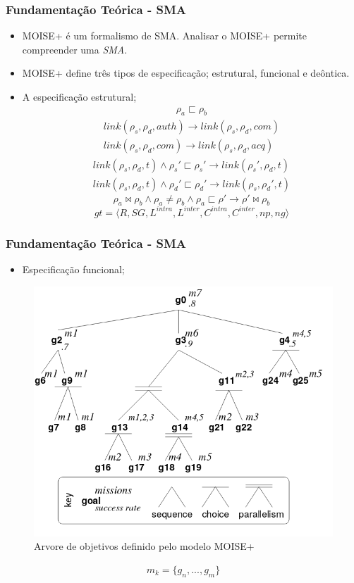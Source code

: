 \documentclass{beamer}
\begin{document}
\begin{frame}
\frametitle{Fundamentação Teórica - SMA}
	\begin{itemize}
		\item MOISE+ é um formalismo de SMA. Analisar o MOISE+ permite compreender uma \textit{SMA}. 
		\item MOISE+ define três tipos de especificação; estrutural, funcional e deôntica. 
		\item A especificação estrutural;
	\begin{eqnarray}
			\rho_a \sqsubset \rho_b
		\end{eqnarray}
		\begin{eqnarray}\nonumber
			link(\rho_s,\rho_d,auth) \to link(\rho_s,\rho_d,com) \nonumber \\
			link(\rho_s,\rho_d,com) \to link(\rho_s,\rho_d,acq) 
		\end{eqnarray}
		\begin{eqnarray}\nonumber
			link(\rho_s,\rho_d,t) \wedge \rho_s' \sqsubset \rho_s' \to link(\rho_s',\rho_d,t) \nonumber \\
			link(\rho_s,\rho_d,t) \wedge \rho_d' \sqsubset \rho_d' \to link(\rho_s,\rho_d',t) 	
		\end{eqnarray}
		\begin{equation}
			\rho_a \bowtie \rho_b \wedge \rho_a \neq \rho_b \wedge \rho_a \sqsubset \rho' \to \rho' \bowtie \rho_b 
		\end{equation}
		\begin{equation}
			gt = \langle R,SG,L^{intra},L^{inter},C^{intra},C^{inter},np,ng\rangle 
		\end{equation}		 
		\end{itemize}
	\end{frame}
\begin{frame}
\frametitle{Fundamentação Teórica - SMA}
	\begin{itemize}
		\item Especificação funcional; 
	\end{itemize}
	\begin{figure}[H]
	  \centering
	  \includegraphics[width=0.4\linewidth]{figure/figmoise} 
	  \caption{Arvore de objetivos definido pelo modelo MOISE+}
	  \label{arvoremoise}
	\end{figure}
	\begin{eqnarray}
		m_k = \{ g_n,...,g_m\}
	\end{eqnarray}

\end{frame}
\end{document}
